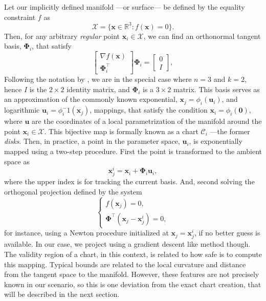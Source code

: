 Let our implicitly defined manifold ---or surface--- be defined by the equality constraint $f$ as
\begin{equation}
\mathcal{X} = \{\mathbf{x} \in \mathbb{R}^3 : f(\mathbf{x}) = 0 \}.
\end{equation}
Then, for any arbitrary \emph{regular} point $\mathbf{x}_i \in \mathcal{X}$, we can find an orthonormal tangent basis, $\boldsymbol{\Phi}_i$, that satisfy
\begin{equation}
\begin{bmatrix} \nabla f(\mathbf{x}) \\ \boldsymbol{\Phi}_i^\top \end{bmatrix} \boldsymbol{\Phi}_i = \begin{bmatrix}  0 \\ I \end{bmatrix}, \label{eq:tangent_basis}
\end{equation}
Following the notation by \citet{Porta2014CuikSuite}, we are in the special case where $n=3$ and $k=2$, hence $I$ is the $2\times2$ identity matrix, and $\boldsymbol{\Phi}_i$ is a $3\times2$ matrix. This basis serves as an approximation of the commonly known exponential, $\mathbf{x}_j = \phi_i(\mathbf{u}_i)$, and logarithmic $\mathbf{u}_i = \phi_i^-1(\mathbf{x}_j)$, mappings, that satisfy the condition $\mathbf{x}_i = \phi_i(\mathbf{0})$, where $\mathbf{u}$ are the coordinates of a local parametrization of the manifold around the point $\mathbf{x}_i \in \mathcal{X}$. This bijective map is formally known as a chart $\mathcal{C}_i$ ---the former \emph{disks}. Then, in practice, a point in the parameter space, $\mathbf{u}_i$, is exponentially mapped using a two-step procedure. First the point is transformed to the ambient space as
\begin{equation}
  \mathbf{x}_j^i = \mathbf{x}_i + \boldsymbol{\Phi}_i \mathbf{u}_i, \label{eq:tangent_approx}
\end{equation}
where the upper index is for tracking the current basis. And, second solving the orthogonal projection defined by the system
\begin{equation}
\begin{cases}
f(\mathbf{x}_j) = 0,
\\
\boldsymbol{\Phi}^\top( \mathbf{x}_j - \mathbf{x}_j^i ) = 0,
\end{cases} \label{eq:projection}
\end{equation}
for instance, using a Newton procedure initialized at $\mathbf{x}_j = \mathbf{x}_j^i$, if no better guess is available. In our case, we project using a gradient descent like method though. The validity region of a chart, in this context, is related to how safe is to compute this mapping. Typical bounds are related to the local curvature and distance from the tangent space to the manifold. However, these features are not precisely known in our scenario, so this is one deviation from the exact chart creation, that will be described in the next section.

